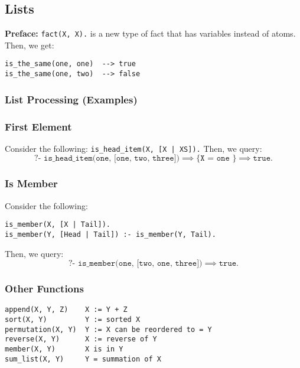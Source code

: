 \documentclass{article}
\begin{document}
\subsection{Lists}
\textbf{Preface:} \texttt{fact(X, X).} is a new type of fact that has variables
instead of atoms. Then, we get:
\begin{verbatim}
is_the_same(one, one)  --> true
is_the_same(one, two)  --> false
\end{verbatim}
\subsubsection{List Processing (Examples)}
\subsubsection*{First Element}
Consider the following: \texttt{is\_head\_item(X, [X | XS]).} Then, we
query:
\[\texttt{?- is\_head\_item(one, [one, two, three])} \implies
  \texttt{\{ X = one \}} \implies \texttt{true}.\]

\subsubsection*{Is Member}
Consider the following:
\begin{verbatim}
is_member(X, [X | Tail]).
is_member(Y, [Head | Tail]) :- is_member(Y, Tail).
\end{verbatim}
Then, we query:
\[\texttt{?- is\_member(one, [two, one, three])} \implies
  \texttt{true}.\]

\subsubsection*{Other Functions}
\begin{verbatim}
append(X, Y, Z)    X := Y + Z
sort(X, Y)         Y := sorted X
permutation(X, Y)  Y := X can be reordered to = Y
reverse(X, Y)      X := reverse of Y
member(X, Y)       X is in Y
sum_list(X, Y)     Y = summation of X
\end{verbatim}
\end{document}
